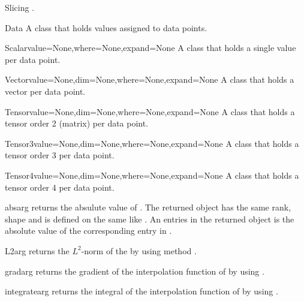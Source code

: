 Slicing .

\begin{classdesc}{Data}{}
A class that holds values assigned to data points.
\end{classdesc}

\begin{classdesc}{Scalar}{value=None,where=None,expand=None}
A class that holds a single value per data point.
\end{classdesc}

\begin{classdesc}{Vector}{value=None,dim=None,where=None,expand=None}
A class that holds a vector per data point.
\end{classdesc}

\begin{classdesc}{Tensor}{value=None,dim=None,where=None,expand=None}
A class that holds a tensor order 2 (matrix) per data point.
\end{classdesc}

\begin{classdesc}{Tensor3}{value=None,dim=None,where=None,expand=None}
A class that holds a tensor order 3 per data point.
\end{classdesc}

\begin{classdesc}{Tensor4}{value=None,dim=None,where=None,expand=None}
A class that holds a tensor order 4 per data point.
\end{classdesc}

\begin{funcdesc}{abs}{arg}
returns the absulute value of \Data {}. The returned
\Data object has the same rank, shape and is defined on the
same  like . An entries in the returned object
is the absolute value of the corresponding entry in .
\end{funcdesc}

\begin{funcdesc}{L2}{arg}
  returns the $L^2$-norm of the \Data {} by using method
.  
\end{funcdesc}

\begin{funcdesc}{grad}{arg}
returns the gradient of the interpolation function of \Data
{} by using . 
\end{funcdesc}

\begin{funcdesc}{integrate}{arg}
returns the integral of the interpolation function of \Data
{} by using . 
\end{funcdesc}

